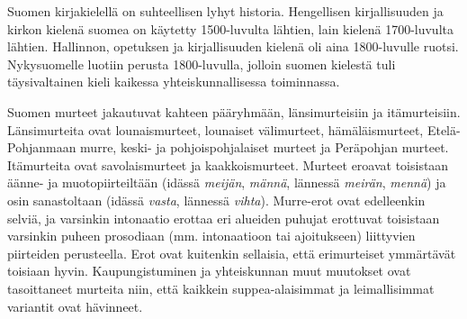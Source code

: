 \documentclass[]{../../metanetpaper}
\begin{document}
\begin{Parallel}[c]{77mm}{77mm}
{Suomen kirjakielellä on suhteellisen lyhyt historia. Hengellisen kirjallisuuden
ja kirkon kielenä suomea on käytetty 1500-luvulta lähtien, lain kielenä
1700-luvulta lähtien. Hallinnon, opetuksen ja kirjallisuuden kielenä oli aina
1800-luvulle ruotsi. Nykysuomelle luotiin perusta 1800-luvulla, jolloin suomen
kielestä tuli täysivaltainen kieli kaikessa yhteiskunnallisessa toiminnassa.

Suomen murteet jakautuvat kahteen pääryhmään, länsimurteisiin ja itämurteisiin.
Länsimurteita ovat lounaismurteet, lounaiset välimurteet, hämäläismurteet,
Etelä-Pohjanmaan murre, keski- ja pohjoispohjalaiset murteet ja Peräpohjan
murteet. Itämurteita ovat savolaismurteet ja kaakkoismurteet. Murteet eroavat
toisistaan äänne- ja muotopiirteiltään (idässä \textit{meijän}, \textit{männä}, lännessä \textit{meirän},
\textit{mennä}) ja osin sanastoltaan (idässä \textit{vasta}, lännessä \textit{vihta}). Murre-erot ovat
edelleenkin selviä, ja varsinkin intonaatio erottaa eri alueiden puhujat
erottuvat toisistaan varsinkin puheen prosodiaan (mm. intonaatioon tai
ajoitukseen) liittyvien piirteiden perusteella. Erot ovat kuitenkin sellaisia,
että erimurteiset ymmärtävät toisiaan hyvin. Kaupungistuminen ja yhteiskunnan
muut muutokset ovat tasoittaneet murteita niin, että kaikkein suppea-alaisimmat
ja leimallisimmat variantit ovat hävinneet.
}

\end{Parallel}
\end{document}
